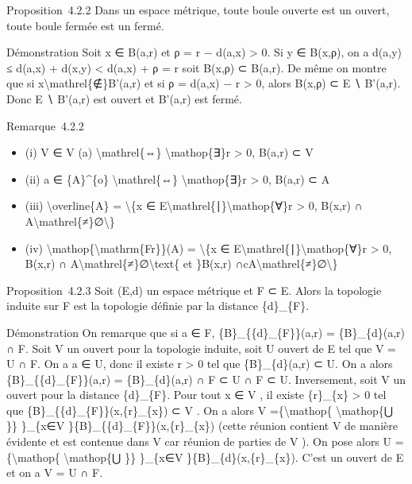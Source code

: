 \documentclass[]{article}
\begin{document}
Proposition~4.2.2 Dans un espace métrique, toute boule ouverte est un
ouvert, toute boule fermée est un fermé.

Démonstration Soit x ∈ B(a,r) et ρ = r − d(a,x) \textgreater{} 0. Si y ∈
B(x,ρ), on a d(a,y) ≤ d(a,x) + d(x,y) \textless{} d(a,x) + ρ = r soit
B(x,ρ) ⊂ B(a,r). De même on montre que si
x\textbackslash{}mathrel\{∉\}B'(a,r) et si ρ = d(a,x) − r \textgreater{}
0, alors B(x,ρ) ⊂ E ∖ B'(a,r). Donc E ∖ B'(a,r) est ouvert et B'(a,r)
est fermé.

Remarque~4.2.2

\begin{itemize}
\itemsep1pt\parskip0pt
\item
  (i) V ∈ V (a) \textbackslash{}mathrel\{⇔\}
  \textbackslash{}mathop\{∃\}r \textgreater{} 0, B(a,r) ⊂ V
\item
  (ii) a ∈ \{A\}\^{}\{o\} \textbackslash{}mathrel\{⇔\}
  \textbackslash{}mathop\{∃\}r \textgreater{} 0, B(a,r) ⊂ A
\item
  (iii) \textbackslash{}overline\{A\} = \textbackslash{}\{x ∈
  E\textbackslash{}mathrel\{∣\}\textbackslash{}mathop\{∀\}r
  \textgreater{} 0, B(x,r) ∩
  A\textbackslash{}mathrel\{≠\}∅\textbackslash{}\}
\item
  (iv) \textbackslash{}mathop\{\textbackslash{}mathrm\{Fr\}\}(A) =
  \textbackslash{}\{x ∈
  E\textbackslash{}mathrel\{∣\}\textbackslash{}mathop\{∀\}r
  \textgreater{} 0, B(x,r) ∩
  A\textbackslash{}mathrel\{≠\}∅\textbackslash{}text\{ et \}B(x,r)
  ∩cA\textbackslash{}mathrel\{≠\}∅\textbackslash{}\}
\end{itemize}

Proposition~4.2.3 Soit (E,d) un espace métrique et F ⊂ E. Alors la
topologie induite sur F est la topologie définie par la distance
\{d\}\_\{F\}.

Démonstration On remarque que si a ∈ F, \{B\}\_\{\{d\}\_\{F\}\}(a,r) =
\{B\}\_\{d\}(a,r) ∩ F. Soit V un ouvert pour la topologie induite, soit
U ouvert de E tel que V = U ∩ F. On a a ∈ U, donc il existe r
\textgreater{} 0 tel que \{B\}\_\{d\}(a,r) ⊂ U. On a alors
\{B\}\_\{\{d\}\_\{F\}\}(a,r) = \{B\}\_\{d\}(a,r) ∩ F ⊂ U ∩ F ⊂ U.
Inversement, soit V un ouvert pour la distance \{d\}\_\{F\}. Pour tout x
∈ V , il existe \{r\}\_\{x\} \textgreater{} 0 tel que
\{B\}\_\{\{d\}\_\{F\}\}(x,\{r\}\_\{x\}) ⊂ V . On a alors V
=\{\textbackslash{}mathop\{ \textbackslash{}mathop\{⋃ \}\} \}\_\{x∈V
\}\{B\}\_\{\{d\}\_\{F\}\}(x,\{r\}\_\{x\}) (cette réunion contient V de
manière évidente et est contenue dans V car réunion de parties de V ).
On pose alors U =\{\textbackslash{}mathop\{ \textbackslash{}mathop\{⋃
\}\} \}\_\{x∈V \}\{B\}\_\{d\}(x,\{r\}\_\{x\}). C'est un ouvert de E et
on a V = U ∩ F.
\end{document}
